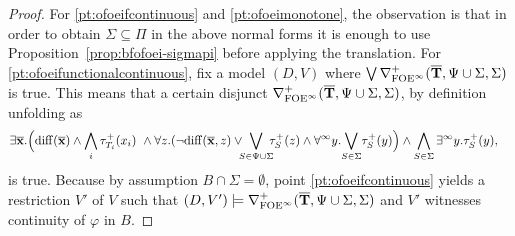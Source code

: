 \begin{proof}
	For \ref{pt:ofoeifcontinuous} and \ref{pt:ofoeimonotone}, the observation is that in order to obtain $\Sigma\subseteq\Pi$ in the above normal forms it is enough to use Proposition~\ref{prop:bfofoei-sigmapi} before applying the translation. For \ref{pt:ofoeifunctionalcontinuous}, fix a model $(D,V)$ where $\bigvee \mondbnfofoei{\vlist{T}}{\Psi \cup \Sigma}{\Sigma}{+}$ is true. This means that a certain disjunct $\mondbnfofoei{\vlist{T}}{\Psi \cup \Sigma}{ \Sigma}{+}$, by definition unfolding as
	\begin{equation*}%
	\begin{aligned}
&\exists \vlist{x}.\Big( \arediff{\vlist{x}} \land \bigwedge_i \tau^+_{T_i}(x_i)\ \land 
 \forall z.(\lnot\arediff{\vlist{x},z} \lor \!\!\!\bigvee_{S\in \Psi \cup \Sigma}\!\!\! \tau^+_S(z) 
 \land \dqu y. \!\bigvee_{S\in\Sigma}\! \tau^+_S(y) \Big) \land \bigwedge_{S\in\Sigma} \qu y.\tau^+_S(y),
\end{aligned}
\end{equation*}
is true. Because by assumption $B \cap \Sigma = \emptyset$, point \ref{pt:ofoeifcontinuous} yields a restriction $V'$ of $V$ such that $(D,V') \models \mondbnfofoei{\vlist{T}}{\Psi \cup \Sigma}{ \Sigma}{+}$ and $V'$ witnesses continuity of $\varphi$ in $B$. %


\end{proof}
